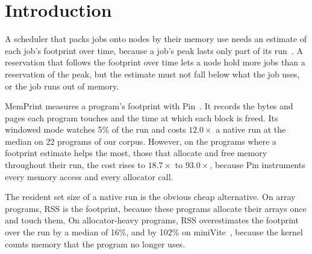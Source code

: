 \documentclass[11pt]{article}
\newcommand{\memprint}{MemPrint}
\begin{document}
\section{Introduction}
\label{sec:intro}

A scheduler that packs jobs onto nodes by their memory use needs an estimate of each job's footprint over time,
because a job's peak lasts only part of its run~\cite{KSplus2024,Zacarias2021Accurate,Li2023Pond}. A reservation
that follows the footprint over time lets a node hold more jobs than a reservation of the peak, but the estimate
must not fall below what the job uses, or the job runs out of memory.

\memprint{} measures a program's footprint with Pin~\cite{Luk2005Pin}. It records the bytes and pages each program
touches and the time at which each block is freed. Its windowed mode watches 5\% of the run and costs $12.0\times$ a
native run at the median on 22 programs of our corpus. However, on the programs where a footprint estimate helps the
most, those that allocate and free memory throughout their run, the cost rises to $18.7\times$ to $93.0\times$,
because Pin instruments every memory access and every allocator call.

The resident set size of a native run is the obvious cheap alternative. On array programs, RSS is the footprint,
because these programs allocate their arrays once and touch them. On allocator-heavy programs, RSS overestimates the
footprint over the run by a median of 16\%, and by 102\% on miniVite~\cite{minivite}, because the kernel counts
memory that the program no longer uses.
\end{document}
